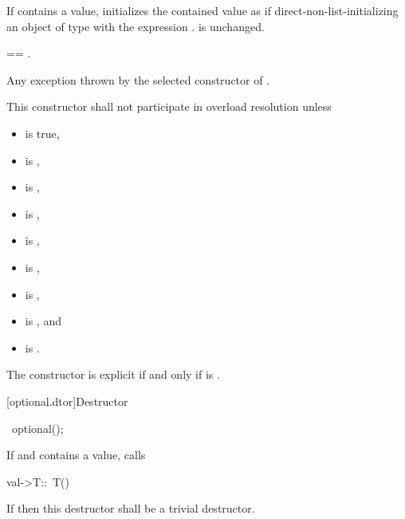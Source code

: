 \begin{itemdescr}
\pnum
\effects
If  contains a value,
initializes the contained value as if direct-non-list-initializing
an object of type  with the expression .
 is unchanged.

\pnum
\postconditions
{} == .

\pnum
\throws
Any exception thrown by the selected constructor of .

\pnum
\remarks
This constructor shall not participate in overload resolution unless
\begin{itemize}
\item {} is true,
\item {} is ,
\item {} is ,
\item {} is ,
\item {} is ,
\item {} is ,
\item {} is ,
\item {} is , and
\item {} is .
\end{itemize}
The constructor is explicit if and only if
 is .
\end{itemdescr}

[optional.dtor]{Destructor}

%
\begin{itemdecl}
~optional();
\end{itemdecl}

\begin{itemdescr}
\pnum
\effects
If  and  contains a value, calls
\begin{codeblock}
val->T::~T()
\end{codeblock}

\pnum
\remarks
If  then this destructor shall be a trivial destructor.
\end{itemdescr}

